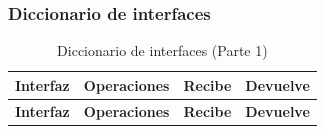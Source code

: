 \subsubsection{Diccionario de interfaces}

\begin{longtable}{|p{5cm}|p{4cm}|p{3.5cm}|p{3.5cm}|}
\caption{Diccionario de interfaces (Parte 1)}
\label{tab:diccionario_interfaces_1} \\

\hline
\textbf{Interfaz} & \textbf{Operaciones} & \textbf{Recibe} & \textbf{Devuelve} \\ \hline
\endfirsthead

\hline
\textbf{Interfaz} & \textbf{Operaciones} & \textbf{Recibe} & \textbf{Devuelve} \\ \hline
\endhead


\end{longtable}

